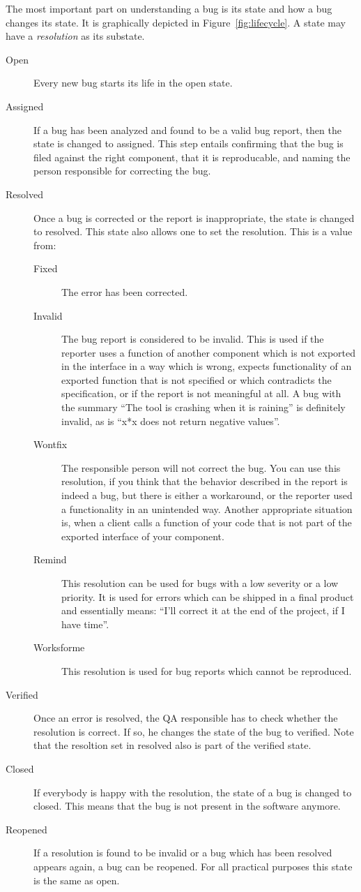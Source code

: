 \documentclass[11pt,handout]{handout}
\begin{document}
The most important part on understanding a bug is its state and how a bug
changes its state.  It is graphically depicted in
Figure~\ref{fig:lifecycle}.  A state may have a \emph{resolution} as its
substate.
\begin{description}
\item[Open]  Every new bug starts its life in the open state.
\item[Assigned]  If a bug has been analyzed and found to be a valid bug
  report, then the state is changed to assigned.  This step entails
  confirming that the bug is filed against the right component, that it
  is reproducable, and naming the person responsible for correcting the
  bug.
\item[Resolved]  Once a bug is corrected or the report is inappropriate,
  the state is changed to resolved.  This state also allows one to set
  the resolution.  This is a value from:
  \begin{description}
  \item[Fixed]  The error has been corrected.
  \item[Invalid]  The bug report is considered to be invalid.  This
    is used if the reporter uses a function of another component which
    is not exported in the interface in a way which is wrong, expects
    functionality of an exported function that is not specified or
    which contradicts the specification, or if the report is not meaningful
    at all.  A bug with the summary ``The tool is crashing when it is
    raining'' is definitely invalid, as is ``x*x does not return negative
    values''.
  \item[Wontfix]  The responsible person will not correct the bug.  You
    can use this resolution, if you think that the behavior described in
    the report is indeed a bug, but there is either a workaround, or the
    reporter used a functionality in an unintended way.  Another
    appropriate situation is, when a client calls a function of your code
    that is not part of the exported interface of your component.
  \item[Remind]  This resolution can be used for bugs with a low severity
    or a low priority.  It is used for errors which can be shipped in a
    final product and essentially means: ``I'll correct it at the end of
    the project, if I have time''.
  \item[Worksforme]  This resolution is used for bug reports which cannot
    be reproduced.
  \end{description}
\item[Verified]  Once an error is resolved, the QA responsible has to check
  whether the resolution is correct.  If so, he changes the state of the
  bug to verified.  Note that the resoltion set in resolved also is part
  of the verified state.
\item[Closed]  If everybody is happy with the resolution, the state of a
  bug is changed to closed.  This means that the bug is not present in the
  software anymore.
\item[Reopened]  If a resolution is found to be invalid or a bug which has
  been resolved appears again, a bug can be reopened.  For all practical
  purposes this state is the same as open.
\end{description}
\end{document}

